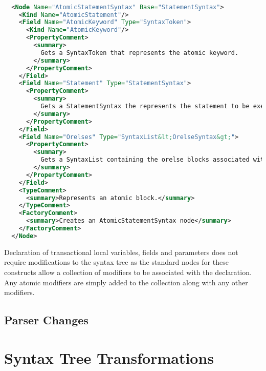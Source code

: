 \begin{lstlisting}[label=lst:roslyn_extension_tre_xml,
  caption={AtomicStatement \ac{XML} definition},
  language=XML,  
  showspaces=false,
  showtabs=false,
  breaklines=true,
  showstringspaces=false,
  breakatwhitespace=true,
  morekeywords={Name, Base, Type}]  % Start your code-block

  <Node Name="AtomicStatementSyntax" Base="StatementSyntax">
    <Kind Name="AtomicStatement"/>
    <Field Name="AtomicKeyword" Type="SyntaxToken">
      <Kind Name="AtomicKeyword"/>
      <PropertyComment>
        <summary>
          Gets a SyntaxToken that represents the atomic keyword.
        </summary>
      </PropertyComment>
    </Field>
    <Field Name="Statement" Type="StatementSyntax">
      <PropertyComment>
        <summary>
          Gets a StatementSyntax the represents the statement to be executed when the condition is true.
        </summary>
      </PropertyComment>
    </Field>
    <Field Name="Orelses" Type="SyntaxList&lt;OrelseSyntax&gt;">
      <PropertyComment>
        <summary>
          Gets a SyntaxList containing the orelse blocks associated with the atomic statement.
        </summary>
      </PropertyComment>
    </Field>
    <TypeComment>
      <summary>Represents an atomic block.</summary>
    </TypeComment>
    <FactoryComment>
      <summary>Creates an AtomicStatementSyntax node</summary>
    </FactoryComment>
  </Node>
\end{lstlisting}

Declaration of transactional local variables, fields and parameters does not require modifications to the syntax tree as the standard nodes for these constructs allow a collection of modifiers to be associated with the declaration. Any atomic modifiers are simply added to the collection along with any other modifiers. 


\subsection{Parser Changes}


\section{Syntax Tree Transformations}
\label{sec:syntax_tree_transformations}

